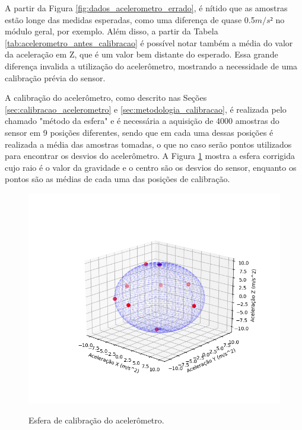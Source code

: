 \documentclass[acronym, symbols, table]{fei}
\begin{document}
					A partir da Figura \ref{fig:dados_acelerometro_errado}, é nítido que as amostras estão longe das medidas esperadas, como uma diferença de quase 0.5$m/s²$ no módulo geral, por exemplo. Além disso, a partir da Tabela \ref{tab:acelerometro_antes_calibracao} é possível notar também a média do valor da aceleração em Z, que é um valor bem distante do esperado. Essa grande diferença invalida a utilização do acelerômetro, mostrando a necessidade de uma calibração prévia do sensor.
				
					A calibração do acelerômetro, como descrito nas Seções \ref{sec:calibracao_acelerometro} e \ref{sec:metodologia_calibracao}, é realizada pelo chamado "método da esfera" e é necessária a aquisição de 4000 amostras do sensor em 9 posições diferentes, sendo que em cada uma dessas posições é realizada a média das amostras tomadas, o que no caso serão pontos utilizados para encontrar os desvios do acelerômetro. A Figura \ref{fig:dados_esfera_certo} mostra a esfera corrigida cujo raio é o valor da gravidade e o centro são os desvios do sensor, enquanto os pontos são as médias de cada uma das posições de calibração.
					
					\begin{figure}[!htb]
						\centering
						\caption{Esfera de calibração do acelerômetro.}
						\includegraphics[width=1.0\textwidth]{dados_esfera_correto.png}
						\label{fig:dados_esfera_certo}
					\end{figure}
					
\end{document}

